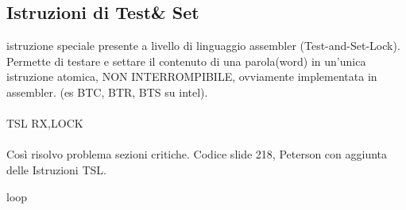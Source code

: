 \documentclass{article}
\begin{document}
\subsection{Istruzioni di Test\& Set}
istruzione speciale presente a livello di linguaggio assembler (Test-and-Set-Lock). Permette di testare e settare il contenuto di una parola(word) in un'unica istruzione atomica, NON INTERROMPIBILE, ovviamente implementata in assembler. (es BTC, BTR, BTS su intel).\\
\\
TSL RX,LOCK\\
\\
Così risolvo problema sezioni critiche. Codice slide 218, Peterson con aggiunta delle Istruzioni TSL.

loop \\
\end{document}

